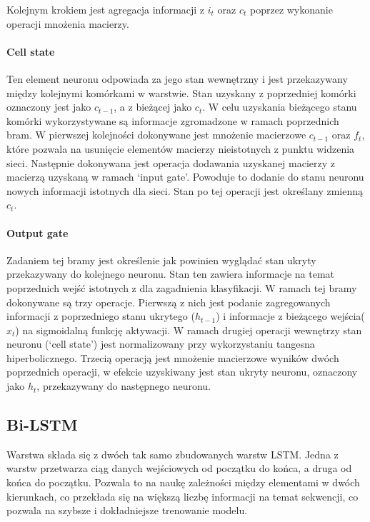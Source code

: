 Kolejnym krokiem jest agregacja informacji z $i_t$ oraz $c_t$ poprzez wykonanie operacji mnożenia macierzy.

\paragraph{Cell state}  \hfill

Ten element neuronu odpowiada za jego stan wewnętrzny i jest przekazywany między kolejnymi komórkami w warstwie. Stan uzyskany z poprzedniej komórki oznaczony jest jako $c_{t-1}$, a z bieżącej jako $c_t$. W celu uzyskania bieżącego stanu komórki wykorzystywane są informacje zgromadzone w ramach poprzednich bram. W pierwszej kolejności dokonywane jest mnożenie macierzowe $c_{t-1}$ oraz $f_t$, które pozwala na usunięcie elementów macierzy nieistotnych z punktu widzenia sieci. Następnie dokonywana jest operacja dodawania uzyskanej macierzy z macierzą uzyskaną w ramach ‘input gate’. Powoduje to dodanie do stanu neuronu nowych informacji istotnych dla sieci. Stan po tej operacji jest określany zmienną $c_t$.


\paragraph{Output gate}  \hfill

Zadaniem tej bramy jest określenie jak powinien wyglądać stan ukryty przekazywany do kolejnego neuronu. Stan ten zawiera informacje na temat poprzednich wejść istotnych z dla zagadnienia klasyfikacji. W ramach tej bramy dokonywane są trzy operacje. Pierwszą z nich jest podanie zagregowanych informacji z poprzedniego stanu ukrytego ($h_{t-1}$) i informacje z bieżącego wejścia($x_t$) na sigmoidalną funkcję aktywacji. W ramach drugiej operacji wewnętrzy stan neuronu (‘cell state’) jest normalizowany przy wykorzystaniu tangesna hiperbolicznego. Trzecią operacją jest mnożenie macierzowe wyników dwóch poprzednich operacji, w efekcie uzyskiwany jest stan ukryty neuronu, oznaczony jako $h_t$, przekazywany do następnego neuronu.

\subsection{Bi-LSTM}


Warstwa składa się z dwóch tak samo zbudowanych warstw LSTM. Jedna z warstw przetwarza ciąg danych wejściowych od początku do końca, a druga od końca do początku. Pozwala to na naukę zależności między elementami w dwóch kierunkach, co przekłada się na większą liczbę informacji na temat sekwencji, co pozwala na szybsze i dokładniejsze trenowanie modelu\cite{BI_LSTM_1}.





